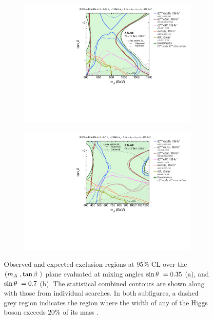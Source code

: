 \begin{figure}[h!]
    \centering
    \begin{subfigure}[2]{0.495\textwidth}
        \centering
        \includegraphics[width=\linewidth]{figures/fig_05a.pdf}
        \caption{}
        \label{fig:result-mA-tanb-scan-a}
    \end{subfigure}
    \begin{subfigure}[2]{0.495\textwidth}
        \centering
        \includegraphics[width=\linewidth]{figures/fig_05b.pdf}
        \caption{}
        \label{fig:result-mA-tanb-scan-b}
    \end{subfigure}
    \caption{Observed and expected exclusion regions at $95\%$ CL over the $(m_A~, \tan\beta~)$ plane evaluated at \thdma mixing angles $\sin\theta~=0.35$ (a), and $\sin\theta~=0.7$ (b). The statistical combined contours are shown along with those from individual searches. In both subfigures, a dashed grey region indicates the region where the width of any of the Higgs boson exceeds $20\%$ of its mass \cite{2hdma_comb}. }
    \label{fig:result-mA-tanb-scan}
\end{figure} 

